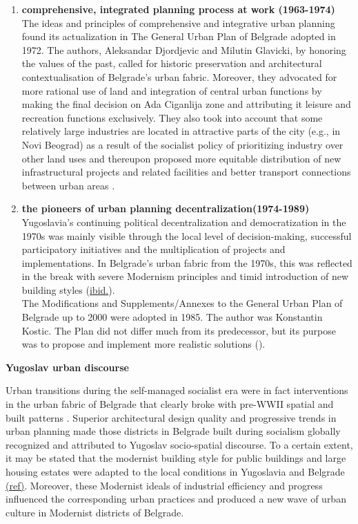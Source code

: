 \documentclass[11pt]{report}
\begin{document}
\begin{enumerate}
\item \textbf{comprehensive, integrated planning process at work (1963-1974)}
\\
The ideas and principles of comprehensive and integrative urban planning found its actualization in The  General  Urban  Plan  of  Belgrade  adopted in 1972.
The authors, Aleksandar Djordjevic and Milutin Glavicki, by honoring the values of the past, called for historic preservation and architectural contextualisation of Belgrade's urban fabric.
Moreover, they advocated for more  rational  use  of  land  and integration of central urban functions by making the final decision on Ada Ciganlija zone and attributing it leisure and recreation functions exclusively. They also took into account that some relatively large industries are located in attractive parts of the city (e.g., in Novi Beograd) as a result of the socialist policy of prioritizing industry over other land uses and thereupon proposed more equitable distribution of new infrastructural projects and related  facilities and better  transport connections between urban areas \href{}{\citealt{hirt_belgrade_2009}}.

\item \textbf{the pioneers of urban planning decentralization(1974-1989)}
\\
Yugoslavia’s continuing political decentralization and democratization in the 1970s was mainly visible through the local level of decision-making, successful participatory initiatives and the multiplication of projects and implementations. In Belgrade’s urban fabric from the 1970s, this was reflected in the break with severe Modernism principles and timid introduction of new building styles (\href{}{ibid.}).
\\
The Modifications  and  Supplements/Annexes  to  the  General  Urban  Plan  of  Belgrade  up  to 2000 were adopted in 1985. The author was Konstantin Kostic.
The Plan did not differ much from its predecessor, but its purpose was to propose and implement more realistic solutions (\href{}{\citealt{grozdanic_belgrade_2008}}).
\end{enumerate}
 
\textbf{Yugoslav urban discourse}

Urban transitions during the self-managed socialist era were in fact interventions in the urban fabric of Belgrade that clearly broke with pre-WWII spatial and built patterns \href{}{\citealt{hirt_belgrade_2009}}. Superior architectural design quality and progressive trends in urban planning made those districts in Belgrade built during socialism globally recognized and attributed to Yugoslav socio-spatial discourse. To a certain extent, it may be stated that the modernist building style for  public  buildings  and  large  housing  estates were adapted to the local conditions in Yugoslavia and Belgrade \href{}{(ref)}.
Moreover, these Modernist ideals of industrial efficiency and progress influenced the corresponding urban practices and produced a new wave of urban culture in Modernist districts of Belgrade.
\\
\end{document}
